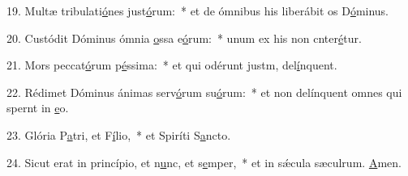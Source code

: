 19. Multæ tribulati\uline{ó}nes just\uline{ó}rum:~* et de ómnibus his liberábit os D\uline{ó}minus.\par 
20. Custódit Dóminus ómnia \uline{o}ssa e\uline{ó}rum:~* unum ex his non cnter\uline{é}tur.\par 
21. Mors peccat\uline{ó}rum p\uline{é}ssima:~* et qui odérunt justm, del\uline{í}nquent.\par 
22. Rédimet Dóminus ánimas serv\uline{ó}rum su\uline{ó}rum:~* et non delínquent omnes qui spernt in \uline{e}o.\par 
23. Glória P\uline{a}tri, et F\uline{í}lio,~* et Spiríti S\uline{a}ncto.\par 
24. Sicut erat in princípio, et n\uline{u}nc, et s\uline{e}mper,~* et in sǽcula sæculrum. \uline{A}men.\par 
